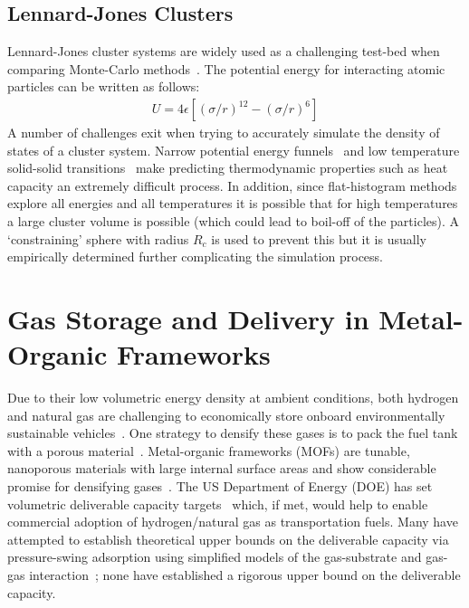 \subsection{Lennard-Jones Clusters}
Lennard-Jones cluster systems are widely used as a challenging test-bed when comparing Monte-Carlo
methods~\cite{doye1998thermodynamics, poulain2006performances, martiniani2014superposition}. The potential
energy for interacting atomic particles can be written as follows:
\begin{align}
U = 4\epsilon \left[\left( \sigma/r \right)^{12} - \left( \sigma/r \right)^{6}\right]
\end{align}
A number of challenges exit when trying to accurately simulate the density of states of a cluster system.
Narrow potential energy funnels~\cite{mandelshtam2006multiple, wales1997global} and low temperature solid-solid
transitions~\cite{neirotti2000phase, calvo2000phase, calvo2000entropic} make predicting thermodynamic properties
such as heat capacity an extremely difficult process. In addition, since flat-histogram methods explore all
energies and all temperatures it is possible that for high temperatures a large cluster volume is possible
(which could lead to boil-off of the particles). A `constraining' sphere with radius $R_c$ is used to prevent
this but it is usually empirically determined further complicating the simulation process.

\section{Gas Storage and Delivery in Metal-Organic Frameworks}

Due to their low volumetric energy density at ambient conditions, both hydrogen
and natural gas are challenging to economically store onboard environmentally
sustainable vehicles~\cite{mason2014evaluating, sircar2002pressure}. One
strategy to densify these gases is to pack the fuel tank with a porous
material~\cite{schoedel2016role}. Metal-organic frameworks (MOFs) are tunable, nanoporous
materials with large internal surface areas and show considerable promise for
densifying gases~\cite{makal2012methane,mason2014evaluating,
suh2011hydrogen,garcia2018benchmark, schoedel2016role}. The US Department of
Energy (DOE) has set volumetric deliverable capacity targets~\cite{simon2015materials, h2targetsDOE} which, if met, would help to enable 
commercial adoption of hydrogen/natural gas as
transportation fuels. Many have attempted to establish theoretical upper bounds
on the deliverable capacity via pressure-swing adsorption using simplified
models of the gas-substrate and gas-gas interaction~\cite{gomez2014exploring, 
gomez2017impact, kaija2018high, lee2019predicting}; none have
established a rigorous upper bound on the deliverable capacity.

